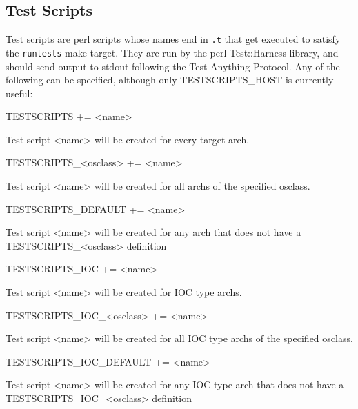 \subsection{Test Scripts}

Test scripts are perl scripts whose names end in \verb|.t| that get executed to satisfy the \verb|runtests| make target. They are run 
by the perl Test::Harness library, and should send output to stdout following the Test Anything Protocol. Any of the 
following can be specified, although only TESTSCRIPTS\_HOST is currently useful:

\begin{description}

\item {}TESTSCRIPTS += \textless{}name\textgreater{}

Test script \textless{}name\textgreater{} will be created for every target arch.

\item TESTSCRIPTS\_\textless{}osclass\textgreater{} += \textless{}name\textgreater{}

Test script \textless{}name\textgreater{} will be created for all archs of the specified osclass.

\item TESTSCRIPTS\_DEFAULT += \textless{}name\textgreater{}

Test script \textless{}name\textgreater{} will be created for any arch that does not have a \\
TESTSCRIPTS\_\textless{}osclass\textgreater{} definition

\item 

\item {}TESTSCRIPTS\_IOC += \textless{}name\textgreater{}

Test script \textless{}name\textgreater{} will be created for IOC type archs.

\item TESTSCRIPTS\_IOC\_\textless{}osclass\textgreater{} += \textless{}name\textgreater{}

Test script \textless{}name\textgreater{} will be created for all IOC type archs of the specified osclass.

\item TESTSCRIPTS\_IOC\_DEFAULT += \textless{}name\textgreater{}

Test script \textless{}name\textgreater{} will be created for any IOC type arch that does not have a \\
TESTSCRIPTS\_IOC\_\textless{}osclass\textgreater{} definition


\end{description}
